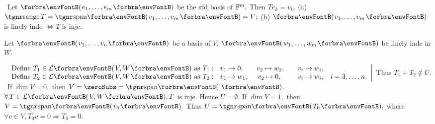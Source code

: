 
\Comment \,\,\,Let $\Par{e_1,\dots,e_m}$ be the std basis of ${\mathbb{F}}^m.$ Then $T{e_k}=v_k.$\parCom
(a) $\range T=\Span{v_1,\dots,v_m}=V;$\; (b) $\Par{v_1,\dots,v_m}$ is linely inde $\Longleftrightarrow T$ is inje.\par
\SepLine

\par\quad
Let $\Par{v_1,\dots,v_n}$ be a basis of $V$, $\Par{w_1,\dots,w_m}$ be linely inde in $W$. \par\hspace{0pt}
$\MathRightMid{l}{$
Define $T_1\in\Lm{V,W}$ as $T_1:\,\,\,\,v_1\mapsto 0,$\qquad$v_2\mapsto w_2,$\qquad$v_i\mapsto w_i$.$\\$
Define $T_2\in\Lm{V,W}$ as $T_2:\,\,\,\,v_1\mapsto w_1,$ \quad\,$v_2\mapsto 0,$\,\,\,\qquad$v_i\mapsto w_i$,\quad $i=3,\dots,n.}$ Thus $T_1+T_2\not\in U.$\PfEnd[-23pt]\vspace{10pt}
\Comment \,\,\,If $\dim V=0,$ then $V=\zeroSubs=\Span{\,}$. $\forall\,T\in\Lm{V,W}, T$ is inje. Hence $U=\emptyset$.\parCom
If $\dim V=1,$ then $V=\Span{v_0}.$ Thus $U=\Span{T_0},$ where $\forall v\in V,T_0 v=0\Rightarrow T_0=0.$\par
\SepLine

